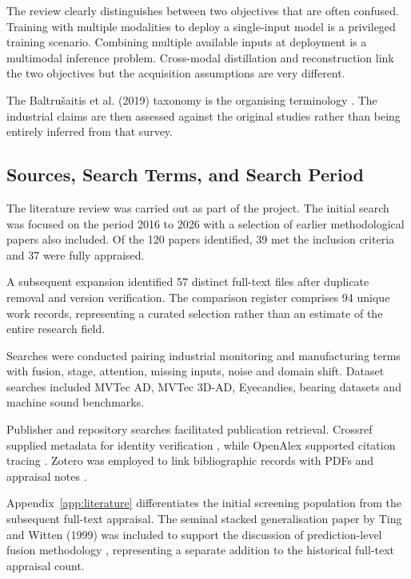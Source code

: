 The review clearly distinguishes between two objectives that are often confused. Training with
multiple modalities to deploy a single-input model is a privileged training scenario. Combining
multiple available inputs at deployment is a multimodal inference problem. Cross-modal distillation
and reconstruction link the two objectives but the acquisition assumptions are very different.

The Baltrušaitis et al. (2019) taxonomy is the organising terminology
\citep{Baltrusaitis2019Multimodal}. The industrial claims are then assessed against the original
studies rather than being entirely inferred from that survey.

\subsection{Sources, Search Terms, and Search Period}

The literature review was carried out as part of the project. The initial search was focused on the
period 2016 to 2026 with a selection of earlier methodological papers also included. Of the 120
papers identified, 39 met the inclusion criteria and 37 were fully appraised.

A subsequent expansion identified 57 distinct full-text files after duplicate removal and version
verification. The comparison register comprises 94 unique work records, representing a curated
selection rather than an estimate of the entire research field.

Searches were conducted pairing industrial monitoring and manufacturing terms with fusion, stage,
attention, missing inputs, noise and domain shift. Dataset searches included MVTec AD, MVTec 3D-AD,
Eyecandies, bearing datasets and machine sound benchmarks.

Publisher and repository searches facilitated publication retrieval. Crossref supplied metadata for
identity verification \citep{Crossref2020REST}, while OpenAlex supported citation tracing
\citep{Priem2022OpenAlex}. Zotero was employed to link bibliographic records with PDFs and appraisal
notes \citep{Zotero2026}.

Appendix~\ref{app:literature} differentiates the initial screening population from the subsequent
full-text appraisal. The seminal stacked generalisation paper by Ting and Witten (1999) was included
to support the discussion of prediction-level fusion methodology \citep{Ting1999Issues},
representing a separate addition to the historical full-text appraisal count.

